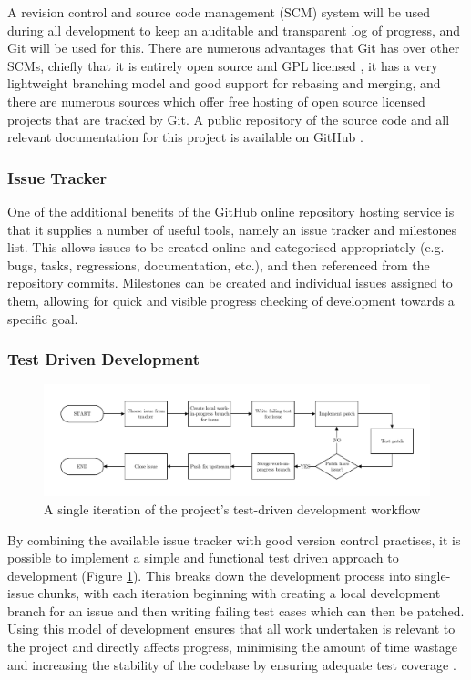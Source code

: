 A revision control and source code management (SCM) system will be used during
all development to keep an auditable and transparent log of progress, and Git
will be used for this. There are numerous advantages that Git has over other
SCMs, chiefly that it is entirely open source and GPL licensed \cite{FSF1991},
it has a very lightweight branching model and good support for rebasing and
merging, and there are numerous sources which offer free hosting of open source
licensed projects that are tracked by Git. A public repository of the source
code and all relevant documentation for this project is available on GitHub
\cite{Cummins2013}.

\subsubsection{Issue Tracker}

One of the additional benefits of the GitHub online repository hosting service
is that it supplies a number of useful tools, namely an issue tracker and
milestones list. This allows issues to be created online and categorised
appropriately (e.g. bugs, tasks, regressions, documentation, etc.), and then
referenced from the repository commits.  Milestones can be created and
individual issues assigned to them, allowing for quick and visible progress
checking of development towards a specific goal.

\subsubsection{Test Driven Development}

\begin{figure}[H]
\centering
\includegraphics[width=7.5in]{assets/flow-tdd.pdf}
\caption{A single iteration of the project’s test-driven development workflow}
\label{fig:flow-tdd}
\end{figure}

By combining the available issue tracker with good version control practises, it
is possible to implement a simple and functional test driven approach to
development (Figure \ref{fig:flow-tdd}). This breaks down the development
process into single-issue chunks, with each iteration beginning with creating a
local development branch for an issue and then writing failing test cases which
can then be patched. Using this model of development ensures that all work
undertaken is relevant to the project and directly affects progress, minimising
the amount of time wastage and increasing the stability of the codebase by
ensuring adequate test coverage \cite{Martin2011}.
